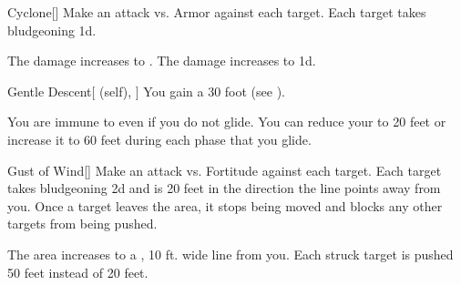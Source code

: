 \lowercase{\hypertarget{spell:Cyclone}{}}\label{spell:Cyclone}
\begin{freeability}[Rank 3]{\hypertarget{spell:Cyclone}{Cyclone}}[]
Make an attack vs. Armor against each target.
\hit Each target takes bludgeoning  \minus1d.

\rankline
{} The damage increases to .
 The damage increases to  \plus1d.
\end{freeability}
\vspace{0.25em}



\lowercase{\hypertarget{spell:Gentle Descent}{}}\label{spell:Gentle Descent}
\begin{attuneability}[Rank 3]{\hypertarget{spell:Gentle Descent}{Gentle Descent}}[ (self), ]
You gain a 30 foot  (see ).

\rankline
{} You are immune to  even if you do not glide.
 You can reduce your  to 20 feet or increase it to 60 feet during each phase that you glide.
\end{attuneability}
\vspace{0.25em}



\lowercase{\hypertarget{spell:Gust of Wind}{}}\label{spell:Gust of Wind}
\begin{freeability}[Rank 3]{\hypertarget{spell:Gust of Wind}{Gust of Wind}}[]
Make an attack vs. Fortitude against each target.
\hit Each target takes bludgeoning  \minus2d and is  20 feet in the direction the line points away from you.
Once a target leaves the area, it stops being moved and blocks any other targets from being pushed.

\rankline
{} The area increases to a \areahuge, 10 ft. wide line from you.
 Each struck target is pushed 50 feet instead of 20 feet.
\end{freeability}
\vspace{0.25em}




